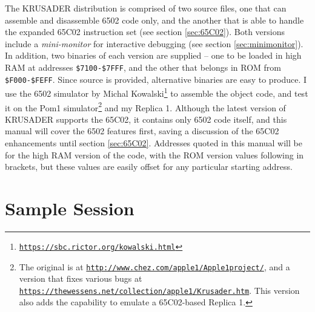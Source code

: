 \documentclass[12pt]{article}
\newcommand{\krusader}{\textsf{KRUSADER}\xspace}
\renewcommand{\url}[1]{\href{#1}{\texttt{#1}}}
\begin{document}
The \krusader distribution is comprised of two source files, one that can assemble and disassemble 6502 code only, and the another that is able to handle the expanded 65C02 instruction set (see section \ref{sec:65C02}). Both versions include a \emph{mini-monitor} for interactive debugging (see section \ref{sec:minimonitor}). In addition, two binaries of each version are supplied -- one to be loaded in high RAM at addresses \texttt{\$7100-\$7FFF}, and the other that belongs in ROM from \texttt{\$F000-\$FEFF}.  Since source is provided, alternative binaries are easy to produce.  I use the 6502 simulator by Michal Kowalski\footnote{\url{https://sbc.rictor.org/kowalski.html}} to assemble the object code, and test it on the Pom1 simulator\footnote{The original is at \url{http://www.chez.com/apple1/Apple1project/}, and a version that fixes various bugs at \url{https://thewessens.net/collection/apple1/Krusader.htm}. This version also adds the capability to emulate a 65C02-based Replica 1.} and my Replica 1.  Although the latest version of \krusader supports the 65C02, it contains only 6502 code itself, and this manual will cover the 6502 features first, saving a discussion of the 65C02 enhancements until section \ref{sec:65C02}.  Addresses quoted in this manual will be for the high RAM version of the code, with the ROM version values following in brackets, but these values are easily offset for any particular starting address.

\section{Sample Session}
\label{sec:samplesession}
\end{document}
